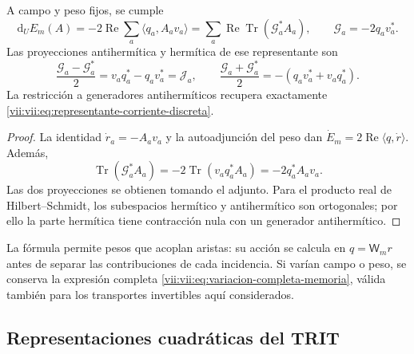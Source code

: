 \begin{proposition}
\label{vii:vii:prop:diferencial-invertible}
A campo y peso fijos, se cumple
\begin{equation}
 \mathrm d_UE_m(A)=-2\operatorname{Re}\sum_a
       \langle q_a,A_av_a\rangle
 =\sum_a\operatorname{Re}\operatorname{Tr}(\mathcal G_a^*A_a),
 \qquad \mathcal G_a=-2q_av_a^*.
 \label{vii:vii:eq:gradiente-transporte-completo}
\end{equation}
Las proyecciones antihermítica y hermítica de ese representante son
\begin{equation}
 \frac{\mathcal G_a-\mathcal G_a^*}{2}
   =v_aq_a^*-q_av_a^*=\mathcal J_a,
 \qquad
 \frac{\mathcal G_a+\mathcal G_a^*}{2}
   =-(q_av_a^*+v_aq_a^*).
 \label{vii:vii:eq:proyecciones-gradiente-memoria}
\end{equation}
La restricción a generadores antihermíticos recupera exactamente
\eqref{vii:vii:eq:representante-corriente-discreta}.
\end{proposition}

\begin{proof}
La identidad \(\dot r_a=-A_av_a\) y la autoadjunción del peso dan
\(\dot E_m=2\operatorname{Re}\langle q,\dot r\rangle\).
Además,
\[
 \operatorname{Tr}(\mathcal G_a^*A_a)
 =-2\operatorname{Tr}(v_aq_a^*A_a)=-2q_a^*A_av_a.
\]
Las dos proyecciones se obtienen tomando el adjunto. Para el producto
real de Hilbert--Schmidt, los subespacios hermítico y antihermítico son
ortogonales; por ello la parte hermítica tiene contracción nula con
un generador antihermítico.
\end{proof}

La fórmula permite pesos que acoplan aristas: su acción se calcula en
\(q=\mathsf W_mr\) antes de separar las contribuciones de cada
incidencia. Si varían campo o peso, se conserva la expresión completa
\eqref{vii:vii:eq:variacion-completa-memoria}, válida también para los
transportes invertibles aquí considerados.

\subsection{Representaciones cuadráticas del TRIT}

